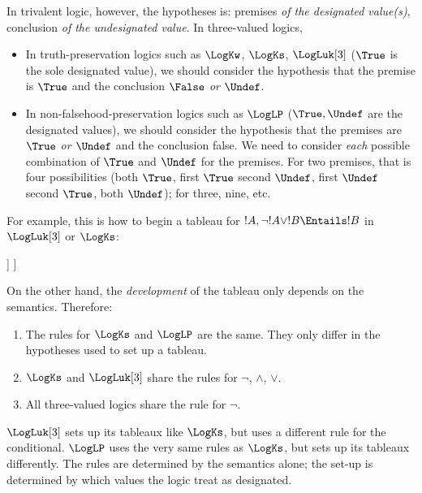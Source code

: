 \documentclass[../../../include/open-logic-section]{subfiles}
\begin{document}
In trivalent logic, however, the hypotheses is: premises \emph{of the 
designated value(s)}, conclusion \emph{of the undesignated value}. In
three-valued logics, 
\begin{itemize}
	\item In truth-preservation logics such as $\LogKw$, $\LogKs$, $\LogLuk[3]$ ($\True$ 
	is the sole designated value), we should consider the hypothesis 
	that the premise is $\True$ and the conclusion $\False$ \emph{or $\Undef$}.
	\item In non-falsehood-preservation logics such as $\LogLP$ ($\True, \Undef$ are the 
	designated values), we should consider the hypothesis that the premises 
	are $\True$ \emph{or $\Undef$} and the conclusion false. We need to consider
	\emph{each} possible combination of $\True$ and $\Undef$ for the premises. For
	two premises, that is four possibilities (both $\True$, first $\True$ second $\Undef$,
	first $\Undef$ second $\True$, both $\Undef$); for three, nine, etc. 
\end{itemize}

For example, this is how to begin a tableau for $!A,\lnot !A \lor !B \Entails !B$ 
in $\LogLuk[3]$ or $\LogKs$:

\begin{oltableau}
	[\sFmla{\True}{\formula{A}}, just=\TAss
		[\sFmla{\True}{\lnot \formula{A} \lor \formula{B}}, just=\TAss
			[\sFmla{\False}{\formula{B}}, just=\TAss]
			[\sFmla{\Undef}{\formula{B}}, just=\TAss]
		]
	]
\end{oltableau}

On the other hand, the \emph{development} of the tableau only depends on
the semantics. Therefore:
\begin{enumerate}
	\item The rules for $\LogKs$ and $\LogLP$ are the same. They only differ
	in the hypotheses used to set up a tableau.
	\item $\LogKs$ and $\LogLuk[3]$ share the rules for $\lnot$, $\land$, $\lor$.
	\item All three-valued logics share the rule for $\lnot$.
\end{enumerate}

$\LogLuk[3]$ sets up its tableaux like $\LogKs$, but uses a different rule for the 
conditional. $\LogLP$ uses the very same rules as $\LogKs$, but sets up its 
tableaux differently. The rules are determined by the semantics alone; the set-up
is determined by which values the logic treat as designated.
\end{document}
